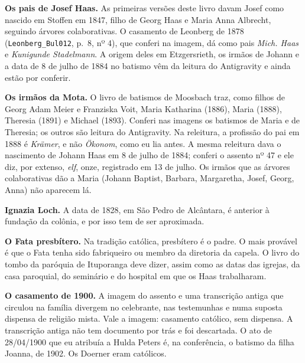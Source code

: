 \documentclass[
  brazilian,
  11pt,
  openany]{book}
\begin{document}
\textbf{Os pais de Josef Haas.} As primeiras versões deste livro davam
Josef como nascido em Stoffen em 1847, filho de Georg Haas e Maria Anna
Albrecht, seguindo árvores colaborativas. O casamento de Leonberg de
1878 (\texttt{Leonberg\_Bul012}, p.~8, nº 4), que conferi na imagem, dá
como pais \emph{Mich. Haas} e \emph{Kunigunde Stadelmann}. A origem
deles em Etzgersrieth, os irmãos de Johann e a data de 8 de julho de
1884 no batismo vêm da leitura do Antigravity e ainda estão por
conferir.

\textbf{Os irmãos da Mota.} O livro de batismos de Moosbach traz, como
filhos de Georg Adam Meier e Franziska Voit, Maria Katharina (1886),
Maria (1888), Theresia (1891) e Michael (1893). Conferi nas imagens os
batismos de Maria e de Theresia; os outros são leitura do Antigravity.
Na releitura, a profissão do pai em 1888 é \emph{Krämer}, e não
\emph{Ökonom}, como eu lia antes. A mesma releitura dava o nascimento de
Johann Haas em 8 de julho de 1884; conferi o assento nº 47 e ele diz,
por extenso, \emph{elf}, onze, registrado em 13 de julho. Os irmãos que
as árvores colaborativas dão a Maria (Johann Baptist, Barbara,
Margaretha, Josef, Georg, Anna) não aparecem lá.

\textbf{Ignazia Loch.} A data de 1828, em São Pedro de Alcântara, é
anterior à fundação da colônia, e por isso tem de ser aproximada.

\textbf{O Fata presbítero.} Na tradição católica, presbítero é o padre.
O mais provável é que o Fata tenha sido fabriqueiro ou membro da
diretoria da capela. O livro do tombo da paróquia de Ituporanga deve
dizer, assim como as datas das igrejas, da casa paroquial, do seminário
e do hospital em que os Haas trabalharam.

\textbf{O casamento de 1900.} A imagem do assento e uma transcrição
antiga que circulou na família divergem no celebrante, nas testemunhas e
numa suposta dispensa de religião mista. Vale a imagem: casamento
católico, sem dispensa. A transcrição antiga não tem documento por trás
e foi descartada. O ato de 28/04/1900 que eu atribuía a Hulda Peters é,
na conferência, o batismo da filha Joanna, de 1902. Os Doerner eram
católicos.
\end{document}

